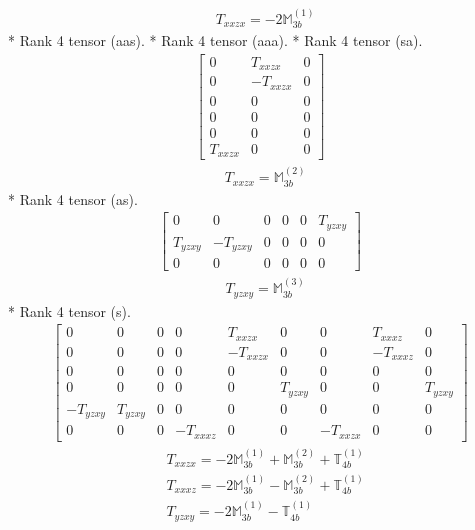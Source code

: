 \documentclass[fleqn,8pt,landscape]{jsarticle}
\begin{document}
\begin{align*}
& T_{xxzx} = - 2 \mathbb{M}_{3b}^{(1)}
\end{align*}
* Rank 4 tensor (aas).
* Rank 4 tensor (aaa).
* Rank 4 tensor (sa).
\begin{align*}
\begin{bmatrix} 0 & T_{xxzx} & 0 \\ 0 & - T_{xxzx} & 0 \\ 0 & 0 & 0 \\ 0 & 0 & 0 \\ 0 & 0 & 0 \\ T_{xxzx} & 0 & 0 \end{bmatrix}
\end{align*}
\begin{align*}
& T_{xxzx} = \mathbb{M}_{3b}^{(2)}
\end{align*}
* Rank 4 tensor (as).
\begin{align*}
\begin{bmatrix} 0 & 0 & 0 & 0 & 0 & T_{yzxy} \\ T_{yzxy} & - T_{yzxy} & 0 & 0 & 0 & 0 \\ 0 & 0 & 0 & 0 & 0 & 0 \end{bmatrix}
\end{align*}
\begin{align*}
& T_{yzxy} = \mathbb{M}_{3b}^{(3)}
\end{align*}
* Rank 4 tensor (s).
\begin{align*}
\begin{bmatrix} 0 & 0 & 0 & 0 & T_{xxzx} & 0 & 0 & T_{xxxz} & 0 \\ 0 & 0 & 0 & 0 & - T_{xxzx} & 0 & 0 & - T_{xxxz} & 0 \\ 0 & 0 & 0 & 0 & 0 & 0 & 0 & 0 & 0 \\ 0 & 0 & 0 & 0 & 0 & T_{yzxy} & 0 & 0 & T_{yzxy} \\ - T_{yzxy} & T_{yzxy} & 0 & 0 & 0 & 0 & 0 & 0 & 0 \\ 0 & 0 & 0 & - T_{xxxz} & 0 & 0 & - T_{xxzx} & 0 & 0 \end{bmatrix}
\end{align*}
\begin{align*}
& T_{xxzx} = - 2 \mathbb{M}_{3b}^{(1)} + \mathbb{M}_{3b}^{(2)} + \mathbb{T}_{4b}^{(1)} \\
& T_{xxxz} = - 2 \mathbb{M}_{3b}^{(1)} - \mathbb{M}_{3b}^{(2)} + \mathbb{T}_{4b}^{(1)} \\
& T_{yzxy} = - 2 \mathbb{M}_{3b}^{(1)} - \mathbb{T}_{4b}^{(1)}
\end{align*}
\end{document}
